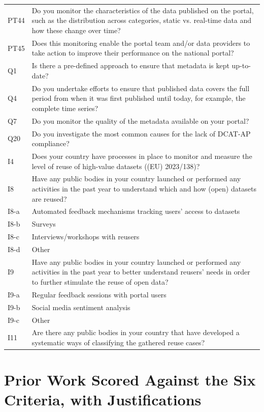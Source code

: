 {\begin{longtable}[]{@{}
  L{0.1386}
  L{0.8614}@{}}
PT44 & Do you monitor the characteristics of the data published on the portal, such as the distribution across categories, static vs. real-time data and how these change over time? \\
PT45 & Does this monitoring enable the portal team and/or data providers to take action to improve their performance on the national portal? \\
Q1 & Is there a pre-defined approach to ensure that metadata is kept up-to-date? \\
Q4 & Do you undertake efforts to ensure that published data covers the full period from when it was first published until today, for example, the complete time series? \\
Q7 & Do you monitor the quality of the metadata available on your portal? \\
Q20 & Do you investigate the most common causes for the lack of DCAT-AP compliance? \\
I4 & Does your country have processes in place to monitor and measure the level of reuse of high-value datasets ((EU) 2023/138)? \\
I8 & Have any public bodies in your country launched or performed any activities in the past year to understand which and how (open) datasets are reused? \\
I8-a & Automated feedback mechanisms tracking users' access to datasets \\
I8-b & Surveys \\
I8-c & Interviews/workshops with reusers \\
I8-d & Other \\
I9 & Have any public bodies in your country launched or performed any activities in the past year to better understand reusers' needs in order to further stimulate the reuse of open data? \\
I9-a & Regular feedback sessions with portal users \\
I9-b & Social media sentiment analysis \\
I9-c & Other \\
I11 & Are there any public bodies in your country that have developed a systematic ways of classifying the gathered reuse cases? \\
\end{longtable}
}


\chapter{Prior Work Scored Against the Six Criteria, with Justifications}\label{app:prior-work-scored}

